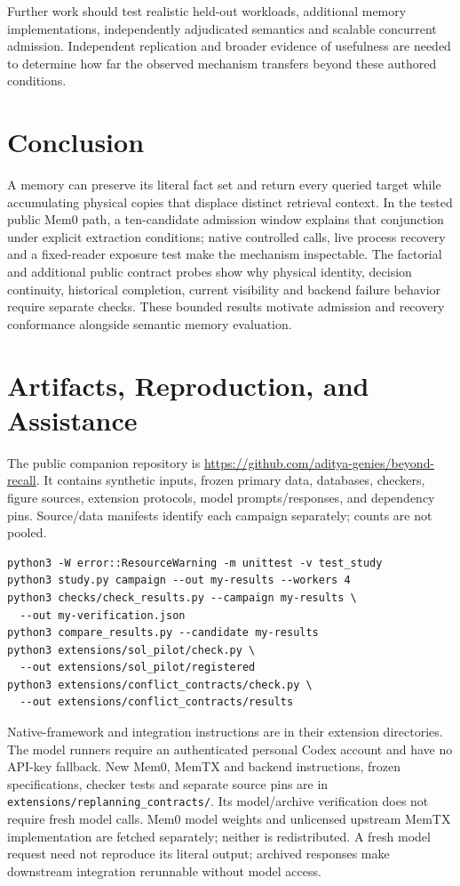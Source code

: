 \documentclass[10pt,letterpaper]{article}
\begin{document}
Further work should test realistic held-out workloads, additional memory implementations, independently adjudicated semantics and scalable concurrent admission. Independent replication and broader evidence of usefulness are needed to determine how far the observed mechanism transfers beyond these authored conditions.

\section{Conclusion}
A memory can preserve its literal fact set and return every queried target while accumulating physical copies that displace distinct retrieval context. In the tested public Mem0 path, a ten-candidate admission window explains that conjunction under explicit extraction conditions; native controlled calls, live process recovery and a fixed-reader exposure test make the mechanism inspectable. The factorial and additional public contract probes show why physical identity, decision continuity, historical completion, current visibility and backend failure behavior require separate checks. These bounded results motivate admission and recovery conformance alongside semantic memory evaluation.

\clearpage


\clearpage
\appendix
\small
\section{Artifacts, Reproduction, and Assistance}
The public companion repository is \url{https://github.com/aditya-genies/beyond-recall}. It contains synthetic inputs, frozen primary data, databases, checkers, figure sources, extension protocols, model prompts/responses, and dependency pins. Source/data manifests identify each campaign separately; counts are not pooled.

\begin{verbatim}
python3 -W error::ResourceWarning -m unittest -v test_study
python3 study.py campaign --out my-results --workers 4
python3 checks/check_results.py --campaign my-results \
  --out my-verification.json
python3 compare_results.py --candidate my-results
python3 extensions/sol_pilot/check.py \
  --out extensions/sol_pilot/registered
python3 extensions/conflict_contracts/check.py \
  --out extensions/conflict_contracts/results
\end{verbatim}

Native-framework and integration instructions are in their extension directories. The model runners require an authenticated personal Codex account and have no API-key fallback. New Mem0, MemTX and backend instructions, frozen specifications, checker tests and separate source pins are in \texttt{extensions/replanning\_contracts/}. Its model/archive verification does not require fresh model calls. Mem0 model weights and unlicensed upstream MemTX implementation are fetched separately; neither is redistributed. A fresh model request need not reproduce its literal output; archived responses make downstream integration rerunnable without model access.
\end{document}
